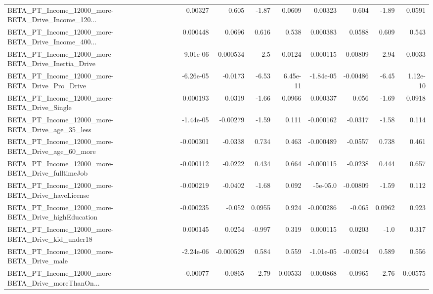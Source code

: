 \begin{tabular}{lrrrrrrrr}
BETA\_PT\_Income\_12000\_more-BETA\_Drive\_Income\_120... &     0.00327 &        0.605 &    -1.87 &   0.0609 &    0.00323 &       0.604 &        -1.89 &        0.0591 \\
BETA\_PT\_Income\_12000\_more-BETA\_Drive\_Income\_400... &    0.000448 &       0.0696 &    0.616 &    0.538 &   0.000383 &      0.0588 &        0.609 &         0.543 \\
BETA\_PT\_Income\_12000\_more-BETA\_Drive\_Inertia\_Drive &   -9.01e-06 &    -0.000534 &     -2.5 &   0.0124 &   0.000115 &     0.00809 &        -2.94 &        0.0033 \\
BETA\_PT\_Income\_12000\_more-BETA\_Drive\_Pro\_Drive     &   -6.26e-05 &      -0.0173 &    -6.53 & 6.45e-11 &  -1.84e-05 &    -0.00486 &        -6.45 &      1.12e-10 \\
BETA\_PT\_Income\_12000\_more-BETA\_Drive\_Single        &    0.000193 &       0.0319 &    -1.66 &   0.0966 &   0.000337 &       0.056 &        -1.69 &        0.0918 \\
BETA\_PT\_Income\_12000\_more-BETA\_Drive\_age\_35\_less   &   -1.44e-05 &     -0.00279 &    -1.59 &    0.111 &  -0.000162 &     -0.0317 &        -1.58 &         0.114 \\
BETA\_PT\_Income\_12000\_more-BETA\_Drive\_age\_60\_more   &   -0.000301 &      -0.0338 &    0.734 &    0.463 &  -0.000489 &     -0.0557 &        0.738 &         0.461 \\
BETA\_PT\_Income\_12000\_more-BETA\_Drive\_fulltimeJob   &   -0.000112 &      -0.0222 &    0.434 &    0.664 &  -0.000115 &     -0.0238 &        0.444 &         0.657 \\
BETA\_PT\_Income\_12000\_more-BETA\_Drive\_haveLicense   &   -0.000219 &      -0.0402 &    -1.68 &    0.092 &   -5e-05.0 &    -0.00809 &        -1.59 &         0.112 \\
BETA\_PT\_Income\_12000\_more-BETA\_Drive\_highEducation &   -0.000235 &       -0.052 &   0.0955 &    0.924 &  -0.000286 &      -0.065 &       0.0962 &         0.923 \\
BETA\_PT\_Income\_12000\_more-BETA\_Drive\_kid\_under18   &    0.000145 &       0.0254 &   -0.997 &    0.319 &   0.000115 &      0.0203 &         -1.0 &         0.317 \\
BETA\_PT\_Income\_12000\_more-BETA\_Drive\_male          &   -2.24e-06 &    -0.000529 &    0.584 &    0.559 &  -1.01e-05 &    -0.00244 &        0.589 &         0.556 \\
BETA\_PT\_Income\_12000\_more-BETA\_Drive\_moreThanOn... &    -0.00077 &      -0.0865 &    -2.79 &  0.00533 &  -0.000868 &     -0.0965 &        -2.76 &       0.00575 \\

\end{tabular}
